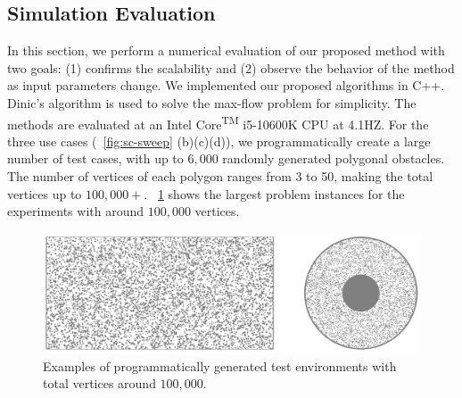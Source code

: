 \subsection{Simulation Evaluation}
In this section, we perform a numerical evaluation of our proposed method
with two goals: (1) confirms the scalability and (2) observe the behavior 
of the method as input parameters change. 
%
We implemented our proposed algorithms in C++. Dinic's algorithm is used to solve the max-flow problem \cite{dinitz1970algorithm} for simplicity. 
The methods are evaluated at an Intel\textsuperscript{\textregistered} Core\textsuperscript{TM} i5-10600K CPU at 4.1HZ.
%
For the three use cases (~\ref{fig:sc-sweep} (b)(c)(d)), we
programmatically create a large number of test cases, with up to 
$6,000$ randomly generated polygonal obstacles. 
%
The number of vertices of each polygon ranges from 3 to 50, making the total vertices up to 
$100,000+$. 
%
~\ref{fig:sc-cases} shows the largest problem instances for the experiments with 
around $100,000$ vertices.
\begin{figure}[ht]
    \centering
    \includegraphics[width=.95\linewidth]{chapters/sc/fig/cases.png}
    \caption{Examples of programmatically generated test environments with total 
    vertices around $100,000$.}
    \label{fig:sc-cases}
\end{figure}

